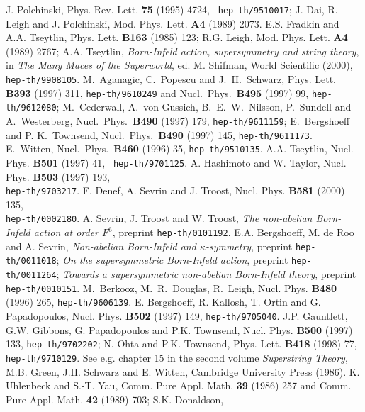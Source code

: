 \documentclass[a4paper,12pt,oneside]{article}
\begin{document}
\begin{thebibliography}{99}
 J. Polchinski, Phys. Rev. Lett. {\bf 75} (1995) 4724, {\tt 
hep-th/9510017}; J. Dai, R. Leigh and J. Polchinski, Mod. Phys. Lett. {\bf 
A4} (1989) 2073.
 E.S. Fradkin and A.A. Tseytlin, Phys. Lett. {\bf B163} (1985) 
123; R.G. Leigh, Mod. Phys. Lett. {\bf A4} (1989) 2767; A.A. 
Tseytlin, {\em Born-Infeld action, supersymmetry and string theory}, in 
{\em The Many Maces of the Superworld}, ed. M. Shifman, World Scientific 
(2000), {\tt hep-th/9908105}.
  M.~Aganagic, C.~Popescu and J.~H.~Schwarz,
Phys. Lett. {\bf B393} (1997) 311, {\tt hep-th/9610249} and
Nucl.~Phys.~{\bf B495} (1997) 99, {\tt hep-th/9612080};
M.~Cederwall, A.~von Gussich, B.~E.~W.~Nilsson, P.~Sundell and A.~Westerberg,
Nucl.~Phys.~{\bf B490} (1997) 179, {\tt hep-th/9611159};
E.~Bergshoeff and P. K.~Townsend, Nucl.~Phys.~{\bf B490} (1997) 145,
{\tt hep-th/9611173}.
  E.~Witten, Nucl.~Phys.~{\bf B460} (1996) 35,
{\tt hep-th/9510135}.
A.A. Tseytlin, Nucl. Phys. {\bf B501} (1997) 41, {\tt
hep-th/9701125}.
 A. Hashimoto and W. Taylor, Nucl. Phys. {\bf B503} (1997)
193,\\ {\tt hep-th/9703217}.
  F. Denef, A. Sevrin and J. Troost, Nucl. Phys. {\bf B581}
 (2000) 135,\\ {\tt hep-th/0002180}.
 A. Sevrin, J. Troost and W. Troost,
{\em The non-abelian Born-Infeld action at order $F^6$}, 
preprint {\tt hep-th/0101192}.
 E.A. Bergshoeff, M. de Roo and A. Sevrin, 
{\em Non-abelian Born-Infeld and $\kappa$-symmetry}, preprint
{\tt hep-th/0011018};
{\em On the supersymmetric Born-Infeld action}, preprint {\tt hep-th/0011264}; 
{\em Towards a supersymmetric non-abelian Born-Infeld theory},  preprint {\tt hep-th/0010151}.
  M.~Berkooz, M.~R.~Douglas, R.~Leigh,
Nucl. Phys. {\bf B480} (1996) 265, {\tt hep-th/9606139}.
 E. Bergshoeff, R. Kallosh, T. Ortin and G. Papadopoulos, 
Nucl. Phys. {\bf B502} (1997) 149, {\tt hep-th/9705040}.
 J.P. Gauntlett, G.W. Gibbons, G. Papadopoulos and P.K. 
Townsend, Nucl. Phys. {\bf B500} (1997) 133, {\tt hep-th/9702202}; N. Ohta 
and P.K. Townsend, Phys. Lett. {\bf B418} (1998) 77, {\tt hep-th/9710129}.
 See e.g. chapter 15 in the second volume {\em Superstring Theory},
M.B. Green, J.H. Schwarz and E. Witten, Cambridge University Press (1986).
 K. Uhlenbeck and S.-T. Yau, Comm. Pure Appl. Math. {\bf 39} 
(1986) 257 and Comm. Pure Appl. Math. {\bf 42} (1989) 703; S.K. Donaldson, 

\end{thebibliography}
\end{document}
